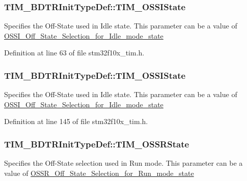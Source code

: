 \subsubsection[{\texorpdfstring{T\+I\+M\+\_\+\+O\+S\+S\+I\+State}{TIM_OSSIState}}]{ T\+I\+M\+\_\+\+B\+D\+T\+R\+Init\+Type\+Def\+::\+T\+I\+M\+\_\+\+O\+S\+S\+I\+State}\hypertarget{struct_t_i_m___b_d_t_r_init_type_def_a649d0314640b8813a123a609421828c9}{}\label{struct_t_i_m___b_d_t_r_init_type_def_a649d0314640b8813a123a609421828c9}
Specifies the Off-\/\+State used in Idle state. This parameter can be a value of \hyperlink{group___o_s_s_i___off___state___selection__for___idle__mode__state}{O\+S\+S\+I\+\_\+\+Off\+\_\+\+State\+\_\+\+Selection\+\_\+for\+\_\+\+Idle\+\_\+mode\+\_\+state} 

Definition at line 63 of file stm32f10x\+\_\+tim.\+h.

\subsubsection[{\texorpdfstring{T\+I\+M\+\_\+\+O\+S\+S\+I\+State}{TIM_OSSIState}}]{ T\+I\+M\+\_\+\+B\+D\+T\+R\+Init\+Type\+Def\+::\+T\+I\+M\+\_\+\+O\+S\+S\+I\+State}\hypertarget{struct_t_i_m___b_d_t_r_init_type_def_ad8891e3739a7db8a45343d4e2f9d2824}{}\label{struct_t_i_m___b_d_t_r_init_type_def_ad8891e3739a7db8a45343d4e2f9d2824}
Specifies the Off-\/\+State used in Idle state. This parameter can be a value of \hyperlink{group___o_s_s_i___off___state___selection__for___idle__mode__state}{O\+S\+S\+I\+\_\+\+Off\+\_\+\+State\+\_\+\+Selection\+\_\+for\+\_\+\+Idle\+\_\+mode\+\_\+state} 

Definition at line 145 of file stm32f10x\+\_\+tim.\+h.

\subsubsection[{\texorpdfstring{T\+I\+M\+\_\+\+O\+S\+S\+R\+State}{TIM_OSSRState}}]{ T\+I\+M\+\_\+\+B\+D\+T\+R\+Init\+Type\+Def\+::\+T\+I\+M\+\_\+\+O\+S\+S\+R\+State}\hypertarget{struct_t_i_m___b_d_t_r_init_type_def_abc0f14fe18b7b49bb85780cb23a52bb8}{}\label{struct_t_i_m___b_d_t_r_init_type_def_abc0f14fe18b7b49bb85780cb23a52bb8}
Specifies the Off-\/\+State selection used in Run mode. This parameter can be a value of \hyperlink{group___o_s_s_r___off___state___selection__for___run__mode__state}{O\+S\+S\+R\+\_\+\+Off\+\_\+\+State\+\_\+\+Selection\+\_\+for\+\_\+\+Run\+\_\+mode\+\_\+state} 

